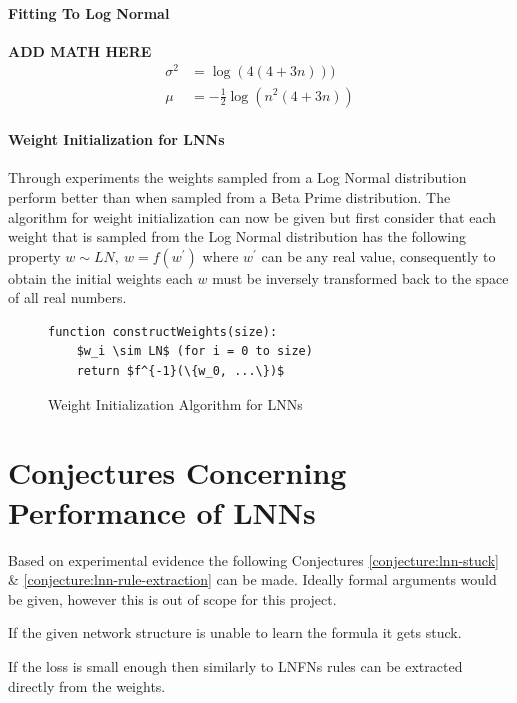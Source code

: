 \paragraph{Fitting To Log Normal}

\textbf{ADD MATH HERE}
\begin{align*}
	\sigma^2 &= \log (4(4 + 3n)))\\
	\mu &= -\frac{1}{2}\log (n^2(4 + 3n))
\end{align*}


\paragraph{Weight Initialization for LNNs}
Through experiments the weights sampled from a Log Normal distribution perform better than when sampled from a Beta Prime distribution. The algorithm for weight initialization can now be given but first consider that each weight that is sampled from the Log Normal distribution has the following property $w \sim LN,\ w = f(w^{'})$ where $w^{'}$ can be any real value, consequently to obtain the initial weights each $w$ must be inversely transformed back to the space of all real numbers.

\begin{figure}[H]
	\begin{lstlisting}[mathescape=true]
  function constructWeights(size):
    $w_i \sim LN$ (for i = 0 to size)
    return $f^{-1}(\{w_0, ...\})$
	\end{lstlisting}
	\caption{Weight Initialization Algorithm for LNNs}
	\label{alg:lnn-initlization}
\end{figure}

\section{Conjectures Concerning Performance of LNNs}

Based on experimental evidence the following Conjectures \ref{conjecture:lnn-stuck} \& \ref{conjecture:lnn-rule-extraction} can be made. Ideally formal arguments would be given, however this is out of scope for this project.

\begin{conjecture}
	If the given network structure is unable to learn the formula it gets stuck.
	\label{conjecture:lnn-stuck}
\end{conjecture}

\begin{conjecture}
	If the loss is small enough then similarly to LNFNs rules can be extracted directly from the weights.
	\label{conjecture:lnn-rule-extraction}
\end{conjecture}

